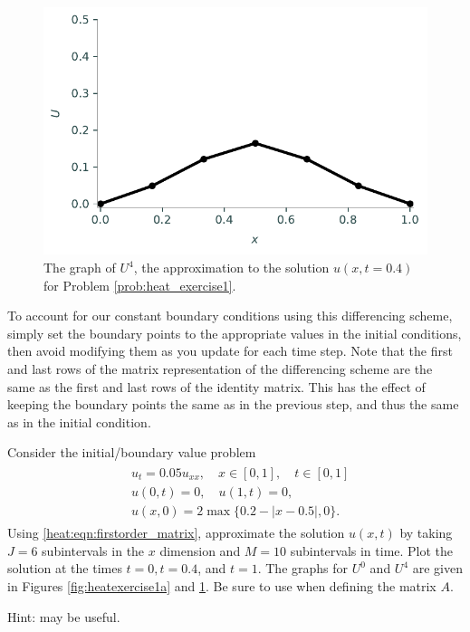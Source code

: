 \begin{figure}
\centering
\includegraphics[width=\textwidth]{figures/heatexercise1b.pdf}
\caption{The graph of $U^{4}$, the approximation to the solution $u(x,t=0.4)$ for Problem \ref{prob:heat_exercise1}.}
\label{fig:heatexercise1b}
\end{figure}

To account for our constant boundary conditions using this differencing scheme, simply set the boundary points to the appropriate values in the initial conditions, then avoid modifying them as you update for each time step.
Note that the first and last rows of the matrix representation of the differencing scheme are the same as the first and last rows of the identity matrix.
This has the effect of keeping the boundary points the same as in the previous step, and thus the same as in the initial condition.

\begin{problem}
\label{prob:heat_exercise1}
Consider the initial/boundary value problem
\begin{align}
	\begin{split}
	&{ } u_t = 0.05 u_{xx}, \quad x \in [0,1], \quad t \in [0,1]\\
	&{ } u(0,t) = 0,\quad u(1,t) = 0,\\
	&{ } u(x,0) = 2\max\{0.2 - |x-0.5|,0\}.
	\end{split}
\end{align}
Using \eqref{heat:eqn:firstorder_matrix}, approximate the solution $u(x,t)$ by taking $J = 6$ subintervals in the $x$ dimension and $M = 10$ subintervals in time.
Plot the solution at the times $t=0, t=0.4$, and $t=1$.
The graphs for $U^0$ and $U^{4}$ are given in Figures \ref{fig:heatexercise1a} and \ref{fig:heatexercise1b}.
Be sure to use  when defining the matrix $A$.

Hint:  may be useful.
\end{problem}

